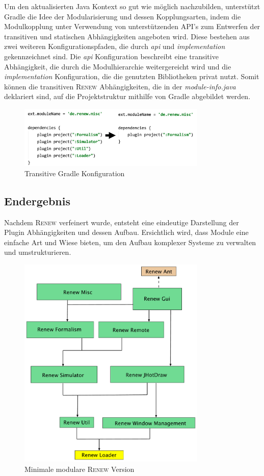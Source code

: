 	Um den aktualisierten Java Kontext so gut wie möglich nachzubilden, unterstützt Gradle die Idee der  Modularisierung und dessen Kopplungsarten, indem die Modulkopplung unter Verwendung von unterstützenden API's zum Entwerfen der transitiven und statischen Abhängigkeiten angeboten wird. Diese bestehen aus zwei weiteren Konfigurationspfaden, die durch \textit{api} und \textit{implementation} gekennzeichnet sind. Die \textit{api} Konfiguration beschreibt eine transitive Abhängigkeit, die durch die Modulhierarchie weitergereicht wird und die \textit{implementation} Konfiguration, die die genutzten Bibliotheken privat nutzt. Somit können die transitiven \textsc{Renew} Abhängigkeiten, die in der \textit{module-info.java} deklariert sind, auf die Projektstruktur mithilfe von Gradle abgebildet werden.

	\begin{figure}[h!]
	  \centering
	  \includegraphics[width=0.8\textwidth]{material/images/gradle_misc.png}
	  \caption{Transitive Gradle Konfiguration}
	  \label{fig:trans_gradle}
	\end{figure}

\subsection{Endergebnis} \label{sub:endergebnis}
	Nachdem \textsc{Renew} verfeinert wurde, entsteht eine eindeutige Darstellung der Plugin Abhängigkeiten und dessen Aufbau. Ersichtlich wird, dass Module eine einfache Art und Wiese bieten, um den Aufbau komplexer Systeme zu verwalten und umstrukturieren.

	\begin{figure}[h!]
	  \centering
	  \includegraphics[width=0.8\textwidth]{material/images/renew_plugin_dependencies-migrate_opt.pdf}
	  \caption{Minimale modulare \textsc{Renew} Version}
	  \label{fig:fin_res}
	\end{figure}